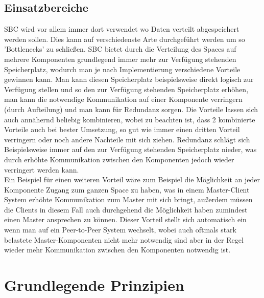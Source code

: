 \documentclass[a4paper,12pt]{scrreprt}
\begin{document}
	\section{Einsatzbereiche}
		SBC wird vor allem immer dort verwendet wo Daten verteilt abgespeichert werden sollen. Dies kann auf verschiedenste Arte durchgeführt werden um so 'Bottlenecks' %
		zu schließen. SBC bietet durch die Verteilung des Spaces auf mehrere Komponenten grundlegend immer mehr zur Verfügung stehenden Speicherplatz, wodurch man je nach Implementierung verschiedene Vorteile gewinnen kann. Man kann diesen Speicherplatz beispielsweise direkt logisch zur Verfügung stellen und so den zur Verfügung stehenden Speicherplatz erhöhen, man kann die notwendige  Kommunikation auf einer Komponente verringern (durch Aufteilung) und man kann für Redundanz sorgen. Die Vorteile lassen sich auch annähernd beliebig kombinieren, wobei zu beachten ist, dass 2 kombinierte Vorteile auch bei bester Umsetzung, so gut wie immer einen dritten Vorteil verringern oder noch andere Nachteile mit sich ziehen. Redundanz schlägt sich Beispielsweise immer auf den zur Verfügung stehenden Speicherplatz nieder, was durch erhöhte Kommunikation zwischen den Komponenten jedoch wieder verringert werden kann. \\    Ein Beispiel für einen weiteren Vorteil wäre zum Beispiel die Möglichkeit an jeder Komponente Zugang zum ganzen Space zu haben, was in einem Master-Client System erhöhte Kommunikation zum Master mit sich bringt, außerdem müssen die Clients in diesem Fall auch durchgehend die Möglichkeit haben zumindest einen Master ansprechen zu können. Dieser Vorteil stellt sich automatisch ein wenn man auf ein Peer-to-Peer System wechselt, wobei auch oftmals stark belastete Master-Komponenten nicht mehr notwendig sind aber in der Regel wieder mehr Kommunikation zwischen den Komponenten notwendig ist.
\chapter{Grundlegende Prinzipien}
	
\end{document}
